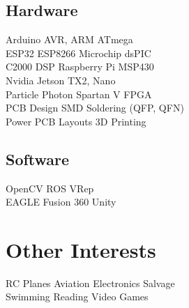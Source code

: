 \documentclass[]{deedy-resume-openfont}
\begin{document}
\begin{minipage}[t]{0.33\textwidth}
\subsection{Hardware}
Arduino AVR, ARM \textbullet{} ATmega \\
ESP32  \textbullet{} ESP8266 \textbullet{} Microchip dsPIC \\
C2000 DSP \textbullet{} Raspberry Pi \textbullet{} MSP430 \\
Nvidia Jetson TX2, Nano \\
Particle Photon \textbullet{} Spartan V FPGA\\
PCB Design \textbullet{} SMD Soldering (QFP, QFN) \\
Power PCB Layouts \textbullet{} 3D Printing \\
\sectionsep

\subsection{Software}
OpenCV \textbullet{} ROS  \textbullet{} VRep \\
EAGLE  \textbullet{} Fusion 360 \textbullet{} Unity\\
\sectionsep

\section{Other Interests}

RC Planes \textbullet{} Aviation \textbullet{} Electronics Salvage\\
Swimming \textbullet{} Reading \textbullet{} Video Games \\

\sectionsep

%

%
%

\end{minipage} 
\end{document}

